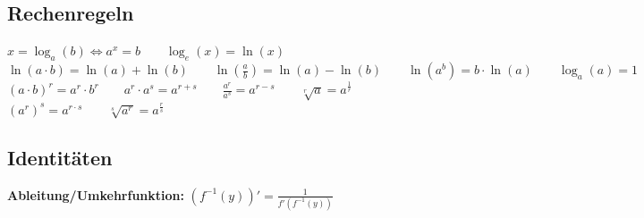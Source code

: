 \subsection{Rechenregeln}
$x=\log_a(b) \Leftrightarrow a^x = b \qquad \log_e(x) = \ln(x)$\\
$\ln(a\cdot b) = \ln(a)+\ln(b) \qquad \ln\left( \frac{a}{b} \right) = \ln(a) - \ln(b) \qquad \ln(a^b)=b\cdot \ln(a) \qquad \log_a(a)=1 \qquad \log(1) = 0$\\

$(a\cdot b)^r = a^r \cdot b^r \qquad a^r\cdot a^s = a^{r+s} \qquad \frac{a^r}{a^s}=a^{r-s} \qquad \sqrt[r]{a} = a^{\frac{1}{r}}$\\
$(a^r)^s =a^{r\cdot s} \qquad \sqrt[s]{a^r} = a^{\frac{r}{s}}$\\


\subsection{Identitäten}\label{subs:Identitäten}
\textbf{Ableitung/Umkehrfunktion:} $(f^{-1}(y))'=\frac{1}{f'(f^{-1}(y))}$